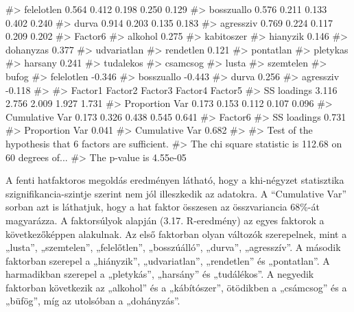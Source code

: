 \documentclass[
  letterpaper,
]{krantz}
\makeatletter
\newenvironment{Shaded}{\begin{snugshade}}{\end{snugshade}}
\newcommand{\CommentTok}[1]{\textcolor[rgb]{0.37,0.37,0.37}{#1}}
\newenvironment{kframe}{%
\medskip{}
\setlength{\fboxsep}{.8em}
 \def\at@end@of@kframe{}%
 \ifinner\ifhmode%
  \def\at@end@of@kframe{\end{minipage}}%
  \begin{minipage}{\columnwidth}%
 \fi\fi%
 \def\FrameCommand##1{\hskip\@totalleftmargin \hskip-\fboxsep
 \colorbox{shadecolor}{##1}\hskip-\fboxsep
     \hskip-\linewidth \hskip-\@totalleftmargin \hskip\columnwidth}%
 \MakeFramed {\advance\hsize-\width
   \@totalleftmargin\z@ \linewidth\hsize
   \@setminipage}}%
 {\par\unskip\endMakeFramed%
 \at@end@of@kframe}
\renewenvironment{Shaded}{\begin{kframe}}{\end{kframe}}
\makeatother
\begin{document}
\begin{Shaded}
\begin{Highlighting}[]
\CommentTok{\#\textgreater{} felelotlen   0.564   0.412   0.198   0.250   0.129 }
\CommentTok{\#\textgreater{} bosszuallo   0.576   0.211   0.133   0.402   0.240 }
\CommentTok{\#\textgreater{} durva        0.914   0.203           0.135   0.183 }
\CommentTok{\#\textgreater{} agressziv    0.769   0.224   0.117   0.209   0.202 }
\CommentTok{\#\textgreater{}             Factor6}
\CommentTok{\#\textgreater{} alkohol      0.275 }
\CommentTok{\#\textgreater{} kabitoszer         }
\CommentTok{\#\textgreater{} hianyzik     0.146 }
\CommentTok{\#\textgreater{} dohanyzas    0.377 }
\CommentTok{\#\textgreater{} udvariatlan        }
\CommentTok{\#\textgreater{} rendetlen    0.121 }
\CommentTok{\#\textgreater{} pontatlan          }
\CommentTok{\#\textgreater{} pletykas           }
\CommentTok{\#\textgreater{} harsany      0.241 }
\CommentTok{\#\textgreater{} tudalekos          }
\CommentTok{\#\textgreater{} csamcsog           }
\CommentTok{\#\textgreater{} lusta              }
\CommentTok{\#\textgreater{} szemtelen          }
\CommentTok{\#\textgreater{} bufog              }
\CommentTok{\#\textgreater{} felelotlen  {-}0.346 }
\CommentTok{\#\textgreater{} bosszuallo  {-}0.443 }
\CommentTok{\#\textgreater{} durva        0.256 }
\CommentTok{\#\textgreater{} agressziv   {-}0.118 }
\CommentTok{\#\textgreater{} }
\CommentTok{\#\textgreater{}                Factor1 Factor2 Factor3 Factor4 Factor5}
\CommentTok{\#\textgreater{} SS loadings      3.116   2.756   2.009   1.927   1.731}
\CommentTok{\#\textgreater{} Proportion Var   0.173   0.153   0.112   0.107   0.096}
\CommentTok{\#\textgreater{} Cumulative Var   0.173   0.326   0.438   0.545   0.641}
\CommentTok{\#\textgreater{}                Factor6}
\CommentTok{\#\textgreater{} SS loadings      0.731}
\CommentTok{\#\textgreater{} Proportion Var   0.041}
\CommentTok{\#\textgreater{} Cumulative Var   0.682}
\CommentTok{\#\textgreater{} }
\CommentTok{\#\textgreater{} Test of the hypothesis that 6 factors are sufficient.}
\CommentTok{\#\textgreater{} The chi square statistic is 112.68 on 60 degrees of...}
\CommentTok{\#\textgreater{} The p{-}value is 4.55e{-}05}
\end{Highlighting}
\end{Shaded}

A fenti hatfaktoros megoldás eredményen látható, hogy a khi-négyzet
statisztika szignifikancia-szintje szerint nem jól illeszkedik az
adatokra. A ``Cumulative Var'' sorban azt is láthatjuk, hogy a hat
faktor összesen az összvariancia 68\%-át magyarázza. A faktorsúlyok
alapján (3.17. R-eredmény) az egyes faktorok a következőképpen
alakulnak. Az első faktorban olyan változók szerepelnek, mint a
„lusta'', „szemtelen'', „felelőtlen'', „bosszúálló'', „durva'',
„agresszív''. A második faktorban szerepel a „hiányzik'',
„udvariatlan'', „rendetlen'' és „pontatlan''. A harmadikban szerepel a
„pletykás'', „harsány'' és „tudálékos''. A negyedik faktorban következik
az „alkohol'' és a „kábítószer'', ötödikben a „csámcsog'' és a „büfög'',
míg az utolsóban a „dohányzás''.
\end{document}
